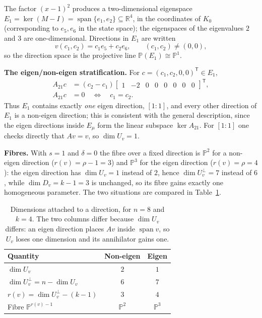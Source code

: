 \documentclass[journal]{IEEEtran}
\theoremstyle{plainn}
\theoremstyle{remark}
\begin{document}
The factor $(x-1)^2$ produces a two-dimensional eigenspace
$E_1=\ker(M-I)=\operatorname{span}\{e_1,e_2\}\subseteq\mathbb{R}^{4}$, in the coordinates of $K_0$
(corresponding to $e_5,e_6$ in the state space); the eigenspaces of the eigenvalues $2$ and $3$ are
one-dimensional. Directions in $E_1$ are written
\begin{equation}\label{sec6:eq:v}
v(c_1,c_2)=c_1e_5+c_2e_6,\qquad (c_1,c_2)\neq(0,0),
\end{equation}
so the direction space is the projective line $\mathbb{P}(E_1)\cong\mathbb{P}^{1}$.

\textbf{The eigen/non-eigen stratification.} For $c=(c_1,c_2,0,0)^{\mathsf{T}}\in E_1$,
\begin{equation}\label{sec6:eq:A21c}
\begin{aligned}
A_{21}c&=(c_2-c_1)\begin{bmatrix}1&-2&0&0&0&0&0&0\end{bmatrix}^{\mathsf{T}},\\
A_{21}c&=0\quad\iff\quad c_1=c_2 .
\end{aligned}
\end{equation}
Thus $E_1$ contains exactly \emph{one} eigen direction, $[1\!:\!1]$, and every other direction of $E_1$
is a non-eigen direction; this is consistent with the general description, since the eigen directions
inside $E_\mu$ form the linear subspace $\ker A_{21}$. For $[1\!:\!1]$ one checks directly that $Av=v$,
so $\dim U_v=1$.

\textbf{Fibres.} With $s=1$ and $\delta=0$ the fibre over a fixed direction is $\mathbb{P}^{2}$ for a
non-eigen direction ($r(v)=\rho-1=3$) and $\mathbb{P}^{3}$ for the eigen direction
($r(v)=\rho=4$): the eigen direction has $\dim U_v=1$ instead of $2$, hence $\dim U_v^{\perp}=7$
instead of $6$, while $\dim D_v=k-1=3$ is unchanged, so its fibre gains exactly one homogeneous
parameter. The two situations are compared in Table~\ref{sec6:tab:dims}.

\begin{table}[t]
\centering
\caption{Dimensions attached to a direction, for $n=8$ and $k=4$. The two columns differ because
$\dim U_v$ differs: an eigen direction places $Av$ inside $\operatorname{span}v$, so $U_v$ loses one
dimension and its annihilator gains one.}
\label{sec6:tab:dims}
\begin{tabular}{@{}lcc@{}}
\toprule
Quantity & Non-eigen & Eigen\\
\midrule
$\dim U_v$ & $2$ & $1$\\
$\dim U_v^{\perp}=n-\dim U_v$ & $6$ & $7$\\
$r(v)=\dim U_v^{\perp}-(k-1)$ & $3$ & $4$\\
Fibre $\mathbb{P}^{r(v)-1}$ & $\mathbb{P}^{2}$ & $\mathbb{P}^{3}$\\
\bottomrule
\end{tabular}
\end{table}
\end{document}
